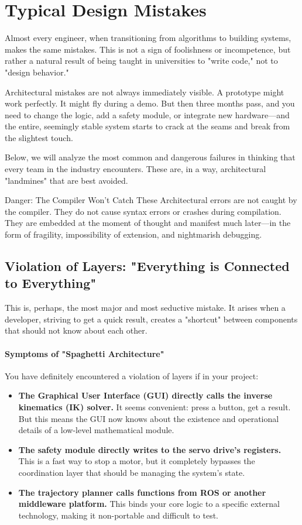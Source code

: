 \section{Typical Design Mistakes}

Almost every engineer, when transitioning from algorithms to building systems, makes the same mistakes. This is not a sign of foolishness or incompetence, but rather a natural result of being taught in universities to "write code," not to "design behavior."

Architectural mistakes are not always immediately visible. A prototype might work perfectly. It might fly during a demo. But then three months pass, and you need to change the logic, add a safety module, or integrate new hardware—and the entire, seemingly stable system starts to crack at the seams and break from the slightest touch.

Below, we will analyze the most common and dangerous failures in thinking that every team in the industry encounters. These are, in a way, architectural "landmines" that are best avoided.

\begin{dangerbox}{Danger: The Compiler Won't Catch These}
Architectural errors are not caught by the compiler. They do not cause syntax errors or crashes during compilation. They are embedded at the moment of thought and manifest much later—in the form of fragility, impossibility of extension, and nightmarish debugging.
\end{dangerbox}

\subsection{Violation of Layers: "Everything is Connected to Everything"}

This is, perhaps, the most major and most seductive mistake. It arises when a developer, striving to get a quick result, creates a "shortcut" between components that should not know about each other.

\paragraph{Symptoms of "Spaghetti Architecture"}

You have definitely encountered a violation of layers if in your project:
\begin{itemize}
    \item \textbf{The Graphical User Interface (GUI) directly calls the inverse kinematics (IK) solver.} It seems convenient: press a button, get a result. But this means the GUI now knows about the existence and operational details of a low-level mathematical module.
    \item \textbf{The safety module directly writes to the servo drive's registers.} This is a fast way to stop a motor, but it completely bypasses the coordination layer that should be managing the system's state.
    \item \textbf{The trajectory planner calls functions from ROS or another middleware platform.} This binds your core logic to a specific external technology, making it non-portable and difficult to test.
\end{itemize}

